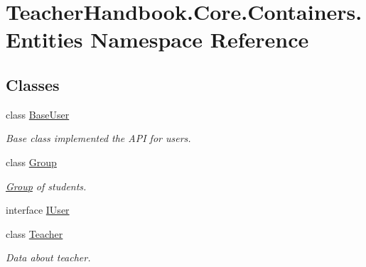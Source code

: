 \hypertarget{namespace_teacher_handbook_1_1_core_1_1_containers_1_1_entities}{}\section{Teacher\+Handbook.\+Core.\+Containers.\+Entities Namespace Reference}
\label{namespace_teacher_handbook_1_1_core_1_1_containers_1_1_entities}
\subsection*{Classes}
\begin{DoxyCompactItemize}
\item 
class \mbox{\hyperlink{class_teacher_handbook_1_1_core_1_1_containers_1_1_entities_1_1_base_user}{Base\+User}}
\begin{DoxyCompactList}\small\item\em Base class implemented the A\+PI for users. \end{DoxyCompactList}\item 
class \mbox{\hyperlink{class_teacher_handbook_1_1_core_1_1_containers_1_1_entities_1_1_group}{Group}}
\begin{DoxyCompactList}\small\item\em \mbox{\hyperlink{class_teacher_handbook_1_1_core_1_1_containers_1_1_entities_1_1_group}{Group}} of students. \end{DoxyCompactList}\item 
interface \mbox{\hyperlink{interface_teacher_handbook_1_1_core_1_1_containers_1_1_entities_1_1_i_user}{I\+User}}
\item 
class \mbox{\hyperlink{class_teacher_handbook_1_1_core_1_1_containers_1_1_entities_1_1_teacher}{Teacher}}
\begin{DoxyCompactList}\small\item\em Data about teacher. \end{DoxyCompactList}\end{DoxyCompactItemize}
